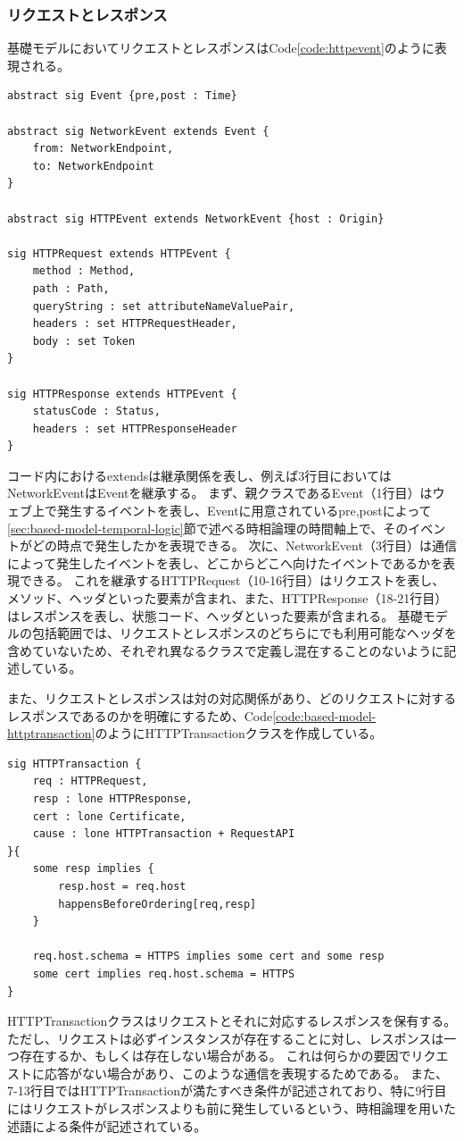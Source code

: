 \documentclass[12pt,a4paper]{jbook}
\begin{document}
\subsubsection{リクエストとレスポンス}
基礎モデルにおいてリクエストとレスポンスはCode\ref{code:httpevent}のように表現される。
\begin{lstlisting}[caption=リクエストとレスポンスを表現するクラス, label=code:httpevent]
abstract sig Event {pre,post : Time}

abstract sig NetworkEvent extends Event {
	from: NetworkEndpoint,
	to: NetworkEndpoint
}

abstract sig HTTPEvent extends NetworkEvent {host : Origin}

sig HTTPRequest extends HTTPEvent { 
	method : Method,
	path : Path,
	queryString : set attributeNameValuePair,
	headers : set HTTPRequestHeader,
	body : set Token
}

sig HTTPResponse extends HTTPEvent {
	statusCode : Status,
	headers : set HTTPResponseHeader
}
\end{lstlisting}
コード内におけるextendsは継承関係を表し、例えば3行目においてはNetworkEventはEventを継承する。
まず、親クラスであるEvent（1行目）はウェブ上で発生するイベントを表し、Eventに用意されているpre,postによって\ref{sec:based-model-temporal-logic}節で述べる時相論理の時間軸上で、そのイベントがどの時点で発生したかを表現できる。
次に、NetworkEvent（3行目）は通信によって発生したイベントを表し、どこからどこへ向けたイベントであるかを表現できる。
これを継承するHTTPRequest（10-16行目）はリクエストを表し、メソッド、ヘッダといった要素が含まれ、また、HTTPResponse（18-21行目）はレスポンスを表し、状態コード、ヘッダといった要素が含まれる。
基礎モデルの包括範囲では、リクエストとレスポンスのどちらにでも利用可能なヘッダを含めていないため、それぞれ異なるクラスで定義し混在することのないように記述している。

また、リクエストとレスポンスは対の対応関係があり、どのリクエストに対するレスポンスであるのかを明確にするため、Code\ref{code:based-model-httptransaction}のようにHTTPTransactionクラスを作成している。
\begin{lstlisting}[caption=リクエストとレスポンスの対応関係, label=code:based-model-httptransaction]
sig HTTPTransaction {
	req : HTTPRequest,
	resp : lone HTTPResponse,
	cert : lone Certificate,
	cause : lone HTTPTransaction + RequestAPI
}{
	some resp implies {
		resp.host = req.host
		happensBeforeOrdering[req,resp]
	}

	req.host.schema = HTTPS implies some cert and some resp
	some cert implies req.host.schema = HTTPS
}
\end{lstlisting}
HTTPTransactionクラスはリクエストとそれに対応するレスポンスを保有する。
ただし、リクエストは必ずインスタンスが存在することに対し、レスポンスは一つ存在するか、もしくは存在しない場合がある。
これは何らかの要因でリクエストに応答がない場合があり、このような通信を表現するためである。
また、7-13行目ではHTTPTransactionが満たすべき条件が記述されており、特に9行目にはリクエストがレスポンスよりも前に発生しているという、時相論理を用いた述語による条件が記述されている。
\end{document}
